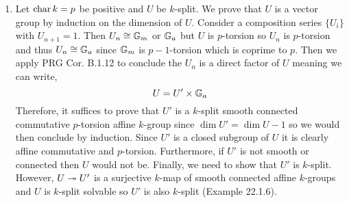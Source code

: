 \documentclass[12pt]{article}
\begin{document}
\begin{enumerate}
\item Let $\operatorname{\mathrm{char}}{k} = p$ be positive and $U$ be $k$-split. We prove that $U$ is a vector group by induction on the dimension of $U$. Consider a composition series $\{ U_i \}$ with $U_{n+1} = 1$. Then $U_n \cong \mathbb{G}_m$ or $\mathbb{G}_a$ but $U$ is $p$-torsion so $U_n$ is $p$-torsion and thus $U_n \cong \mathbb{G}_a$ since $\mathbb{G}_m$ is $p-1$-torsion which is coprime to $p$. Then we apply PRG Cor. B.1.12 to conclude the $U_n$ is a direct factor of $U$ meaning we can write,
\[ U = U' \times \mathbb{G}_a \]
Therefore, it suffices to prove that $U'$ is a $k$-split smooth connected commutative $p$-torsion affine $k$-group since $\dim{U'} = \dim{U} - 1$ so we would then conclude by induction. Since $U'$ is a closed subgroup of $U$ it is clearly affine commutative and $p$-torsion. Furthermore, if $U'$ is not smooth or connected then $U$ would not be. Finally, we need to show that $U'$ is $k$-split. However, $U \twoheadrightarrow U'$ is a surjective $k$-map of smooth connected affine $k$-groups and $U$ is $k$-split solvable so $U'$ is also $k$-split (Example 22.1.6).


\end{enumerate}
\end{document}
